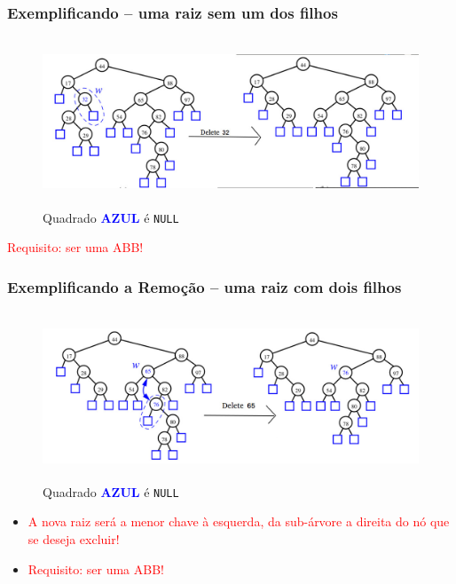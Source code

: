 \begin{frame}
\frametitle{Exemplificando -- uma raiz sem um dos filhos}

   \begin{figure}[!ht]
    \centering
    \includegraphics[keepaspectratio=true,width=12cm,height=5cm]{figs/fig_arvores/ex01_Delete_NODE.jpg}
\caption{Quadrado \textbf{\textcolor{blue}{AZUL}} é \texttt{NULL}}
    \end{figure}

\begin{flushleft}
\textcolor{red}{Requisito: ser uma ABB!}
\end{flushleft}
\end{frame}
\begin{frame}
\frametitle{Exemplificando a Remoção -- uma raiz com dois filhos}

   \begin{figure}[!ht]
    \centering
    \includegraphics[keepaspectratio=true,width=12cm,height=5cm]{figs/fig_arvores/ex02_Delete_NODE.jpg}
   \caption{Quadrado \textbf{\textcolor{blue}{AZUL}} é \texttt{NULL}}
    \end{figure}



\begin{flushleft}
\begin{itemize}
  \item \textcolor{red}{A nova raiz será a menor chave à esquerda, da sub-árvore a direita
do nó que se deseja excluir!}

\item \textcolor{red}{Requisito: ser uma ABB!}

\end{itemize}
\end{flushleft}
\end{frame}
